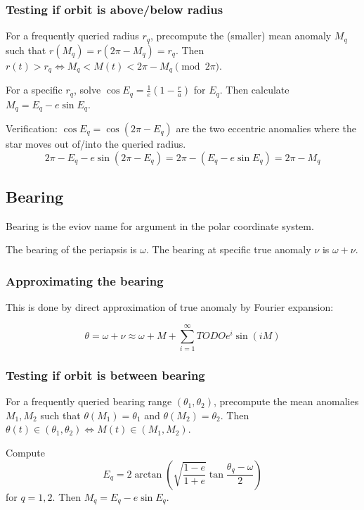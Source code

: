 \documentclass{article}
\def\p#1{ \left( #1 \right)}
\begin{document}
\subsubsection{Testing if orbit is above/below radius}
For a frequently queried radius $r_q$,
precompute the (smaller) mean anomaly $M_q$ such that
$ r(M_q) = r(2\pi - M_q) = r_q$.
Then $r(t) > r_q \iff M_q < M(t) < 2\pi - M_q \pmod{2\pi}$.

For a specific $r_q$,
solve $\cos E_q = \frac1e \p{1 - \frac ra}$ for $E_q$.
Then calculate $M_q = E_q - e \sin E_q$.

Verification: $\cos E_q = \cos(2 \pi - E_q)$ are the two eccentric anomalies
where the star moves out of/into the queried radius.
$$ 2\pi - E_q - e \sin(2\pi - E_q) = 2\pi - \p{E_q - e \sin E_q} = 2\pi - M_q $$

\subsection{Bearing}
Bearing is the eviov name for argument in the polar coordinate system.

The bearing of the periapsis is $\omega$.
The bearing at specific true anomaly $\nu$ is $\omega + \nu$.

\subsubsection{Approximating the bearing}
This is done by direct approximation of true anomaly by Fourier expansion:

$$ \theta = \omega + \nu \approx \omega + M + \sum_{i=1}^\infty TODO e^i \sin(iM) $$

\subsubsection{Testing if orbit is between bearing}
For a frequently queried bearing range $\p{\theta_1, \theta_2}$,
precompute the mean anomalies $M_1, M_2$ such that
$\theta(M_1) = \theta_1$ and $\theta(M_2) = \theta_2$.
Then $\theta(t) \in \p{\theta_1, \theta_2} \iff M(t) \in \p{M_1, M_2}$.

Compute $$ E_q = 2 \arctan\p{ \sqrt{\frac{1-e}{1+e}} \tan\frac{\theta_q - \omega}2 } $$
for $q = 1,2$.
Then $M_q = E_q - e \sin E_q$.
\end{document}
